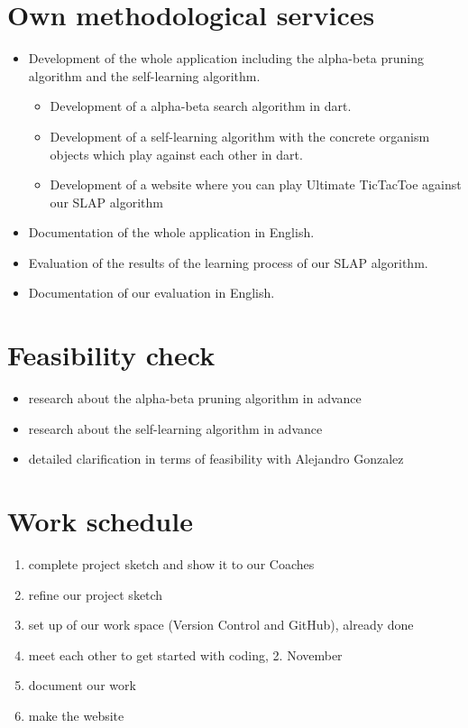 \section{Own methodological services}
\begin{itemize}
    \item Development of the whole application including the alpha-beta pruning algorithm and the self-learning algorithm.
    \begin{itemize}
	    \item Development of a alpha-beta search algorithm in dart.
	    \item Development of a self-learning algorithm with the concrete organism objects which play against each other in dart.
	    \item Development of a website where you can play Ultimate TicTacToe against our SLAP algorithm
    \end{itemize}
    \item Documentation of the whole application in English.
    \item Evaluation of the results of the learning process of our SLAP algorithm.
    \item Documentation of our evaluation in English.
\end{itemize}


\section{Feasibility check}
\begin{itemize}
    \item research about the alpha-beta pruning algorithm in advance
    \item research about the self-learning algorithm in advance
    \item detailed clarification in terms of feasibility with Alejandro Gonzalez
\end{itemize}

\section{Work schedule}
\begin{enumerate}
    \item complete project sketch and show it to our Coaches
    \item refine our project sketch
    \item set up of our work space (Version Control and GitHub), already done
    \item meet each other to get started with coding, 2. November
    \item document our work
    \item make the website
\end{enumerate}

